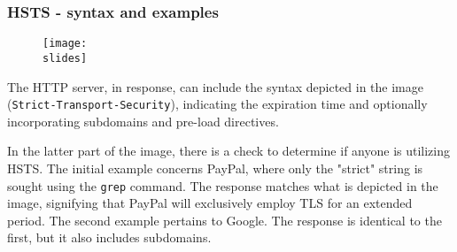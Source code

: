 \subsubsection{HSTS - syntax and examples}

\begin{figure}[h]
    \centering
    \texttt{[image: \\slides]}
\end{figure}

The HTTP server, in response, can include the syntax depicted in the image \\(\texttt{Strict-Transport-Security}), indicating the expiration time and optionally incorporating subdomains and pre-load directives.

In the latter part of the image, there is a check to determine if anyone is utilizing HSTS. The initial example concerns PayPal, where only the "strict" string is sought using the \texttt{grep} command. The response matches what is depicted in the image, signifying that PayPal will exclusively employ TLS for an extended period.
The second example pertains to Google. The response is identical to the first, but it also includes subdomains.
